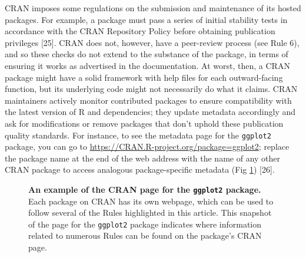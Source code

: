 \documentclass[10pt,letterpaper]{article}
\begin{document}
CRAN imposes some regulations on the submission and maintenance of its
hosted packages. For example, a package must pass a series of initial
stability tests in accordance with the CRAN Repository Policy before
obtaining publication privileges {[}25{]}. CRAN does not, however, have
a peer-review process (see Rule 6), and so these checks do not extend to
the substance of the package, in terms of ensuring it works as
advertised in the documentation. At worst, then, a CRAN package might
have a solid framework with help files for each outward-facing function,
but its underlying code might not necessarily do what it claims. CRAN
maintainers actively monitor contributed packages to ensure
compatibility with the latest version of R and dependencies; they update
metadata accordingly and ask for modifications or remove packages that
don't uphold these publication quality standards. For instance, to see
the metadata page for the \texttt{ggplot2} package, you can go to
\url{https://CRAN.R-project.org/package=ggplot2}; replace the package
name at the end of the web address with the name of any other CRAN
package to access analogous package-specific metadata (Fig \ref{fig4})
{[}26{]}.

\begin{figure}[!h]
\caption{{\bf An example of the CRAN page for the \texttt{ggplot2} package.}
Each package on CRAN has its own webpage, which can be used to follow several of the Rules highlighted in this article. This snapshot of the page for the 
\texttt{ggplot2} package indicates where information related to numerous Rules can be found on the package's CRAN page.}
\label{fig4}
\end{figure}
\end{document}
